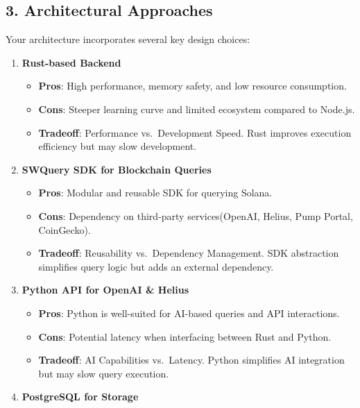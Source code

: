 \documentclass[
]{article}
\providecommand{\tightlist}{%
  \setlength{\itemsep}{0pt}\setlength{\parskip}{0pt}}
\begin{document}
\hypertarget{architectural-approaches}{%
\subsection{\texorpdfstring{\textbf{3. Architectural
Approaches}}{3. Architectural Approaches}}\label{architectural-approaches}}

Your architecture incorporates several key design choices:

\begin{enumerate}
\def\labelenumi{\arabic{enumi}.}
\tightlist
\item
  \textbf{Rust-based Backend}

  \begin{itemize}
  \tightlist
  \item
    \textbf{Pros}: High performance, memory safety, and low resource
    consumption.
  \item
    \textbf{Cons}: Steeper learning curve and limited ecosystem compared
    to Node.js.
  \item
    \textbf{Tradeoff}: Performance vs.~Development Speed. Rust improves
    execution efficiency but may slow development.
  \end{itemize}
\item
  \textbf{SWQuery SDK for Blockchain Queries}

  \begin{itemize}
  \tightlist
  \item
    \textbf{Pros}: Modular and reusable SDK for querying Solana.
  \item
    \textbf{Cons}: Dependency on third-party services(OpenAI, Helius,
    Pump Portal, CoinGecko).
  \item
    \textbf{Tradeoff}: Reusability vs.~Dependency Management. SDK
    abstraction simplifies query logic but adds an external dependency.
  \end{itemize}
\item
  \textbf{Python API for OpenAI \& Helius}

  \begin{itemize}
  \tightlist
  \item
    \textbf{Pros}: Python is well-suited for AI-based queries and API
    interactions.
  \item
    \textbf{Cons}: Potential latency when interfacing between Rust and
    Python.
  \item
    \textbf{Tradeoff}: AI Capabilities vs.~Latency. Python simplifies AI
    integration but may slow query execution.
  \end{itemize}
\item
  \textbf{PostgreSQL for Storage}


\end{enumerate}
\end{document}
